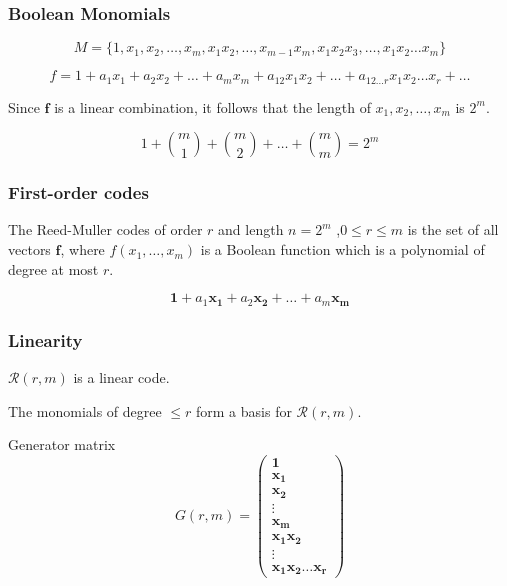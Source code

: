 \documentclass{beamer}
\newcommand{\RM}[2]{\ensuremath{\mathcal{R}(#1,#2)}}
\newcommand{\rem}{Reed-Muller}
\newcommand{\V}[1]{\ensuremath{\mathbf{#1}}}
\begin{document}


\begin{frame}
 \frametitle{Boolean Monomials}
\begin{equation*}
M = \{1,x_1,x_2,\ldots,x_m,x_1x_2,\ldots,x_{m-1}x_m,x_1x_2x_3,\ldots,x_1x_2\ldots x_m\}
\end{equation*}

\begin{equation*}
  f = 1 + a_1x_1+a_2x_2+\ldots+a_mx_m + a_{12}x_1x_2+\ldots+a_{12\ldots r}x_1x_2\ldots x_r+\ldots
\end{equation*}

Since $\V{f}$ is a linear combination, it follows that the length of $x_1, x_2,\ldots,x_m$ is $2^m$.

\begin{equation*}
  1+\binom{m}{1}+\binom{m}{2}+\ldots+\binom{m}{m} = 2^m 
\end{equation*}
\end{frame}



\begin{frame}
 \frametitle{First-order codes}

\begin{defn}
The \rem{} codes of order $r$ and length $n = 2^m$ ,$0 \leq r \leq m$  is the set of all vectors $\V{f}$, where $f(x_1,\ldots,x_m)$ is a Boolean function which is a polynomial of degree at most $r$.
\end{defn}


\begin{equation}
 \V{1}+a_1\V{x_1}+a_2\V{x_2}+\ldots+a_m\V{x_m}
\end{equation}


\end{frame}


\begin{frame}
 \frametitle{Linearity}
\begin{Lemma}[Linearity]
  $\RM{r}{m}$ is a linear code.
\end{Lemma}

\begin{obs}
  The monomials of degree $\leq r$ form a basis for $\RM{r}{m}$.
\end{obs}

Generator matrix
\begin{equation}
  \label{eq:5}
  G(r,m) =
  \begin{pmatrix}
    \V{1} \\
    \V{x_1} \\
    \V{x_2} \\
    \vdots \\
    \V{x_m} \\
    \V{x_1x_2} \\
    \vdots \\
    \V{x_1x_2\ldots x_r}
  \end{pmatrix}
\end{equation}

\end{frame}
\end{document}
